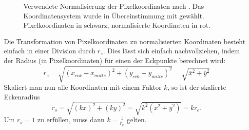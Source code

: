 \begin{figure}[h]
	\centering
	
	\caption{Verwendete Normalisierung der Pixelkoordinaten nach \cite{imatest, lensfun}. Das Koordinatensystem wurde in Übereinstimmung mit \cite[S. 359]{pbrt_book} gewählt. Pixelkoordinaten in schwarz, normalisierte Koordinaten in rot.	\label{fig:normalisation}}
	\label{fig:norm}
\end{figure}

Die Transformation von Pixelkoordinaten zu normalisierten Koordinaten besteht einfach in einer Division durch $r_e$. Dies lässt sich einfach nachvollziehen, indem der Radius (in Pixelkoordinaten) für einen der Eckpunkte berechnet wird:
\begin{equation}
	r_e = \sqrt{(x_{eck} - x_{mitte})^2 + (y_{eck} - y_{mitte})^2} = \sqrt{\overline{x}^2 + \overline{y}^2}
\end{equation}
Skaliert man nun alle Koordinaten mit einem Faktor $k$, so ist der skalierte Eckenradius
\begin{equation}
	r_s = \sqrt{(k \overline{x})^2 + (k \overline{y})^2} = \sqrt{k^2 (\overline{x}^2 + \overline{y}^2)} = k r_e.
\end{equation}
Um $r_s = 1$ zu erfüllen, muss dann $k = \frac{1}{r_e}$ gelten.

